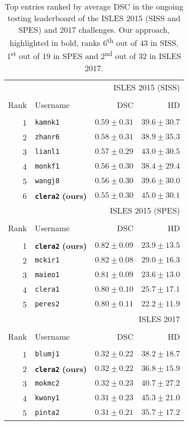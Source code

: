 \documentclass[letterpaper,final,authoryear,3p,times,twocolumn]{elsarticle}
\begin{document}
\begin{table}[t]
	\centering
	\caption{Top entries ranked by average DSC in the ongoing testing leaderboard of the ISLES 2015 (SISS and SPES) and 2017 challenges. Our approach, highlighted in bold, ranks 6\textsuperscript{th} out of 43 in SISS, 1\textsuperscript{st} out of 19 in SPES and 2\textsuperscript{nd} out of 32 in ISLES 2017.}
	\label{table:leaderboards}
	\begin{tabular}{rlrr}
		\multicolumn{4}{r}{ISLES 2015 (SISS)} \\ [-0.75em]
		\multicolumn{4}{r}{\hrulefill} \\
		Rank & Username & DSC & HD \\ [-0.75em]
		\hrulefill & \hrulefill & \hrulefill & \hrulefill \\
		1 & \texttt{kamnk1} & $0.59 \pm 0.31$ & $39.6 \pm 30.7$ \\
		2 & \texttt{zhanr6} & $0.58 \pm 0.31$ & $38.9 \pm 35.3$ \\
		3 & \texttt{lianl1} & $0.57 \pm 0.29$ & $43.0 \pm 30.5$ \\
		4 & \texttt{monkf1} & $0.56 \pm 0.30$ & $38.4 \pm 29.4$ \\
		5 & \texttt{wangj8} & $0.56 \pm 0.30$ & $39.6 \pm 30.0$ \\ 
		6 & \texttt{\textbf{clera2}} \textbf{(ours)}& $0.55 \pm 0.30$ & $45.0 \pm 30.1$ \\ [1.0em]
		\multicolumn{4}{r}{ISLES 2015 (SPES)} \\ [-0.75em]
		\multicolumn{4}{r}{\hrulefill} \\
		Rank & Username & DSC & HD \\ [-0.75em]
		\hrulefill & \hrulefill & \hrulefill & \hrulefill \\
		1 & \texttt{\textbf{clera2}} \textbf{(ours)} & $0.82 \pm 0.09$ & $23.9 \pm 13.5$ \\
		2 & \texttt{mckir1} & $0.82 \pm 0.08$ & $29.0 \pm 16.3$ \\
		3 & \texttt{maieo1} & $0.81 \pm 0.09$ & $23.6 \pm 13.0$ \\
		4 & \texttt{clera1} & $0.80 \pm 0.10$ & $25.7 \pm 17.1$ \\
		5 & \texttt{peres2} & $0.80 \pm 0.11$ & $22.2 \pm 11.9$ \\ [1.0em]
		\multicolumn{4}{r}{ISLES 2017} \\ [-0.75em]
		\multicolumn{4}{r}{\hrulefill} \\
		Rank & Username & DSC & HD \\ [-0.75em]
		\hrulefill & \hrulefill & \hrulefill & \hrulefill \\
		1 & \texttt{blumj1} & $0.32 \pm 0.22$ & $38.2 \pm 18.7$ \\
		2 & \texttt{\textbf{clera2}} \textbf{(ours)} & $0.32 \pm 0.22$ & $36.8 \pm 15.9$ \\
		3 & \texttt{mokmc2} & $0.32 \pm 0.23$ & $40.7 \pm 27.2$ \\
		4 & \texttt{kwony1} & $0.31 \pm 0.23$ & $45.3 \pm 21.0$ \\
		5 & \texttt{pinta2} & $0.31 \pm 0.21$ & $35.7 \pm 17.2$
	\end{tabular}
\end{table}
\end{document}
